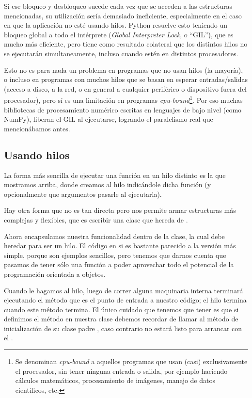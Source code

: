 Si ese bloqueo y desbloqueo sucede cada vez que se acceden a las estructuras mencionadas, su utilización sería demasiado ineficiente, especialmente en el caso en que la aplicación no esté usando hilos. Python resuelve esto teniendo un bloqueo global a todo el intérprete (\textit{Global Interpreter Lock}, o ``GIL''), que es mucho más eficiente, pero tiene como resultado colateral que los distintos hilos no se ejecutarán simultaneamente, incluso cuando estén en distintos procesadores.

Esto no es para nada un problema en programas que no usan hilos (la mayoría), o incluso en programas con muchos hilos que se basan en esperar entradas/salidas (acceso a disco, a la red, o en general a cualquier periférico o dispositivo fuera del procesador), pero sí es una limitación en programas \textit{cpu-bound}\footnote{Se denominan \textit{cpu-bound} a aquellos programas que usan (casi) exclusivamente el procesador, sin tener ninguna entrada o salida, por ejemplo haciendo cálculos matemáticos, procesamiento de imágenes, manejo de datos científicos, etc.}. Por eso muchas bibliotecas de procesamiento numérico escritas en lenguajes de bajo nivel (como NumPy), liberan el GIL al ejecutarse, logrando el paralelismo real que mencionábamos antes.


\subsection{Usando hilos}\label{sub:usando-hilos}

La forma más sencilla de ejecutar una función en un hilo distinto es la que mostramos arriba, donde creamos al hilo indicándole dicha función (y opcionalmente que argumentos pasarle al ejecutarla).

Hay otra forma que no es tan directa pero nos permite armar estructuras más complejas y flexibles, que es escribir una clase que hereda de .


Ahora encapsulamos nuestra funcionalidad dentro de la clase, la cual debe heredar  para ser un hilo. El código en si es bastante parecido a la versión más simple, porque son ejemplos sencillos, pero tenemos que darnos cuenta que pasamos de tener sólo una función a poder aprovechar todo el potencial de la programación orientada a objetos.

Cuando le hagamos  al hilo, luego de correr alguna maquinaria interna terminará ejecutando el método  que es el punto de entrada a nuestro código; el hilo termina cuando este método termina. El único cuidado que tenemos que tener es que si definimos el método  en nuestra clase debemos recordar de llamar al método de inicialización de su clase padre , caso contrario no estará listo para arrancar con el .

